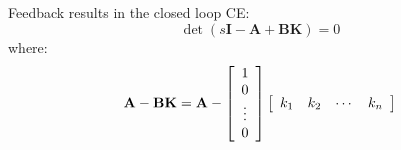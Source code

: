Feedback results in the closed loop CE:
\[
\det(s\mathbf{I}-\mathbf{A}+\mathbf{BK}) = 0
\] 
where:
\[
	{\bf{A}} - {\bf{BK}}  =  {\bf{A}} - \left[ {\begin{array}{*{20}c}
	   1  \\
	   0  \\
	    \vdots   \\
	   0  \\
	\end{array}} \right]\left[ {\begin{array}{*{20}c}
	   {k_1 } & {k_2 } &  \cdots  & {k_n }  \\
	\end{array}} \right] 
\]


\endinput

